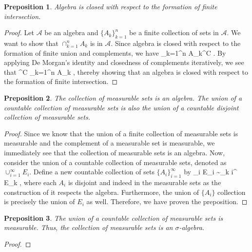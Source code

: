 \documentclass{article} %
\def\eQb#1\eQe{\begin{eqnarray*}#1\end{eqnarray*}}
\theoremstyle{quest}
\newtheorem*{preposition}{Preposition}
\begin{document}
\bigskip

\begin{preposition}
Algebra is closed with respect to the formation of finite intersection.
\end{preposition}
\begin{proof}
Let $\mathcal{A}$ be an algebra and $\{ A_k \}_{k=1}^{n}$ be a finite collection of
sets in $\mathcal{A}$. We want to show that $\cap_{k=1}^{n} A_k$ is in $\mathcal{A}$.
Since algebra is closed with respect to the formation of finite union
and complements, we have 
\eQb
\cup_{k=1}^{n} A_k^{C} \>  \> . 
\eQe
By applying De Morgan's identity and closedness of complements iteratively, we see that
\eQb
{(\cap_{k=1}^{n} A_k)}^{C} \>  \>  \>\>  \>\>
\cap_{k=1}^{n} A_k \>  \> , 
\eQe
thereby showing that an algebra is closed with respect to the formation of finite intersection.
\end{proof}

\bigskip

\begin{preposition}
The collection of measurable sets is an algebra. The union of a countable collection of measurable sets
is also the union of a countable disjoint collection of measurable sets. 
\end{preposition}
\begin{proof} Since we know that the union of a finite collection of measurable sets is measurable 
and the complement of a measurable set is measurable, we immediately see that the collection of
measurable sets is an algebra. Now, consider the union of a countable collection of measurable sets,
denoted as $\cup_{i=1}^{\infty}E_i$. Define a new countable collection of sets 
$\{ A_i \}_{i=1}^{\infty} $
by
\eQb
A_i \triangleq E_i \sim \cup_{k \neq i}^{\infty} E_k , 
\eQe
where each $A_i$ is disjoint and 
indeed in the measurable sets as the construction of it respects the algebra.
Furthermore, the union of $\{ A_i \}$ collection is precisely 
the union of $E_i$ as well. Therefore, we have 
proven the preposition.
\end{proof}

\bigskip

\begin{preposition}
The union of a countable collection of measurable sets is measurable. Thus,
the collection of measurable sets is an $\sigma$-algebra.
\end{preposition}
\begin{proof}
\end{proof}
\bigskip
\end{document}

